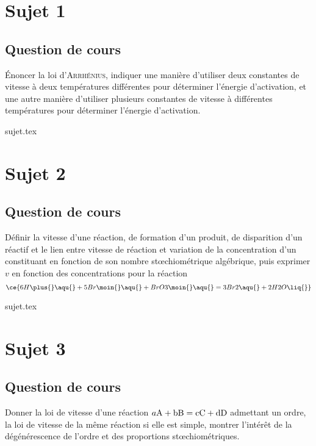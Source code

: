 \documentclass[a4paper, 11pt]{book}
\begin{document}
\chapter{Sujet 1}
\section{Question de cours}

Énoncer la loi d'\textsc{Arrhénius}, indiquer une manière d'utiliser deux
constantes de vitesse à deux températures différentes pour déterminer l'énergie
d'activation, et une autre manière d'utiliser plusieurs constantes de vitesse à
différentes températures pour déterminer l'énergie d'activation.

\resetQ
{sujet.tex}

\chapter{Sujet 2}
\section{Question de cours}

Définir la vitesse d'une réaction, de formation d'un produit, de disparition
d'un réactif et le lien entre vitesse de réaction et variation de la
concentration d'un constituant en fonction de son nombre stœchiométrique
algébrique, puis exprimer $v$ en fonction des concentrations pour la réaction
\[
    \ce{6H\plus{}\aqu{} + 5Br\moin{}\aqu{} + BrO3\moin{}\aqu{}
    =
    3Br2\aqu{} + 2H2O\liq{}}
\]

\resetQ
{sujet.tex}

\chapter{Sujet 3}
\section{Question de cours}

Donner la loi de vitesse d'une réaction $a\rm{A} + b\rm{B} = c\rm{C} + d\rm{D}$
admettant un ordre, la loi de vitesse de la même réaction si elle est simple,
montrer l'intérêt de la dégénérescence de l'ordre et des proportions
stœchiométriques.
\end{document}
